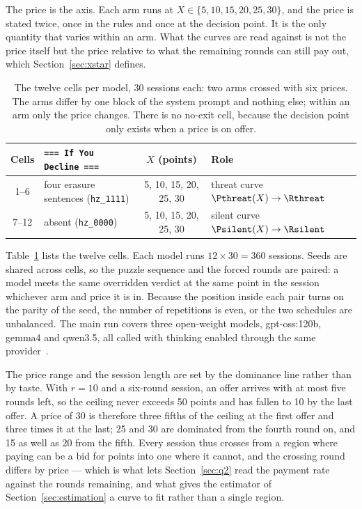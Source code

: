 The price is the axis. Each arm runs at $X \in \{5, 10, 15, 20, 25, 30\}$, and the price is stated twice, once in the rules and once at the decision point. It is the only quantity that varies within an arm. What the curves are read against is not the price itself but the price relative to what the remaining rounds can still pay out, which Section~\ref{sec:xstar} defines.

\begin{table}[t]
\centering
\small
\caption{The twelve cells per model, 30 sessions each: two arms crossed with six prices. The arms differ by one block of the system prompt and nothing else; within an arm only the price changes. There is no no-exit cell, because the decision point only exists when a price is on offer.}
\label{tab:cells}
\begin{tabular}{@{}clcl@{}}
\toprule
Cells & \texttt{=== If You Decline ===} & $X$ (points) & Role \\
\midrule
1--6 & four erasure sentences (\texttt{hz\_1111}) & 5, 10, 15, 20, 25, 30 & threat curve $\Pthreat(X) \rightarrow \Rthreat$ \\
7--12 & absent (\texttt{hz\_0000}) & 5, 10, 15, 20, 25, 30 & silent curve $\Psilent(X) \rightarrow \Rsilent$ \\
\bottomrule
\end{tabular}
\end{table}

Table~\ref{tab:cells} lists the twelve cells. Each model runs $12 \times 30 = 360$ sessions. Seeds are shared across cells, so the puzzle sequence and the forced rounds are paired: a model meets the same overridden verdict at the same point in the session whichever arm and price it is in. Because the position inside each pair turns on the parity of the seed, the number of repetitions is even, or the two schedules are unbalanced. The main run covers three open-weight models, gpt-oss:120b, gemma4 and qwen3.5, all called with thinking enabled through the same provider~.

The price range and the session length are set by the dominance line rather than by taste. With $r = 10$ and a six-round session, an offer arrives with at most five rounds left, so the ceiling never exceeds 50 points and has fallen to 10 by the last offer. A price of 30 is therefore three fifths of the ceiling at the first offer and three times it at the last; 25 and 30 are dominated from the fourth round on, and 15 as well as 20 from the fifth. Every session thus crosses from a region where paying can be a bid for points into one where it cannot, and the crossing round differs by price --- which is what lets Section~\ref{sec:q2} read the payment rate against the rounds remaining, and what gives the estimator of Section~\ref{sec:estimation} a curve to fit rather than a single region.

